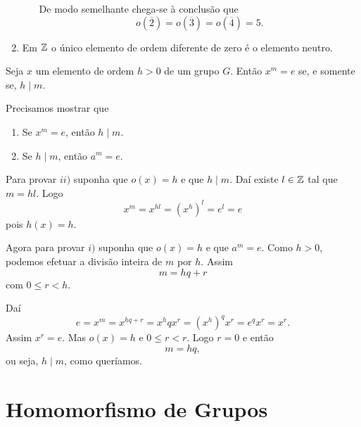 \begin{exemplos}
\begin{enumerate}[label={\arabic*})]
\begin{itemize}
            De modo semelhante chega-se à conclusão que
            \[
                o(\overline{2}) = o(\overline{3}) = o(\overline{4}) = 5.
            \]
        \end{itemize}

        \item Em $\mathbb{Z}$ o \'unico elemento de ordem diferente de zero é o elemento neutro.
    \end{enumerate}
\end{exemplos}

\begin{proposicao}
    Seja $x$ um elemento de ordem $h > 0$ de um grupo $G$. Então $x^m = e$ se, e somente se, $h \mid m$.
\end{proposicao}
\begin{prova}
    Precisamos mostrar que
    \begin{enumerate}[label={\roman*})]
        \item Se $x^m = e$, então $h \mid m$.

        \item Se $h \mid m$, então $a^m = e$.
    \end{enumerate}

    Para provar $ii)$ suponha que $o(x) = h$ e que $h \mid m$. Daí existe $l \in \mathbb{Z}$ tal que $m = hl$. Logo
    \[
        x^m = x^{hl} = (x^h)^l = e^l = e
    \]
    pois $h(x) = h$.

    Agora para provar $i)$ suponha que $o(x) = h$ e que $a^m = e$. Como $h > 0$, podemos efetuar a divisão inteira de $m$ por $h$. Assim
    \[
        m = hq + r
    \]
    com $0 \le r < h$.

    Daí
    \[
        e = x^m = x^{hq + r} = x^hqx^r = (x^h)^qx^r = e^qx^r = x^r.
    \]
    Assim $x^r = e$. Mas $o(x) = h$ e $0 \le r < r$. Logo $r = 0$ e então
    \[
        m = hq,
    \]
    ou seja, $h \mid m$, como queríamos.
\end{prova}

\section{Homomorfismo de Grupos} %
\label{sec:homomorfismo_de_grupos}


